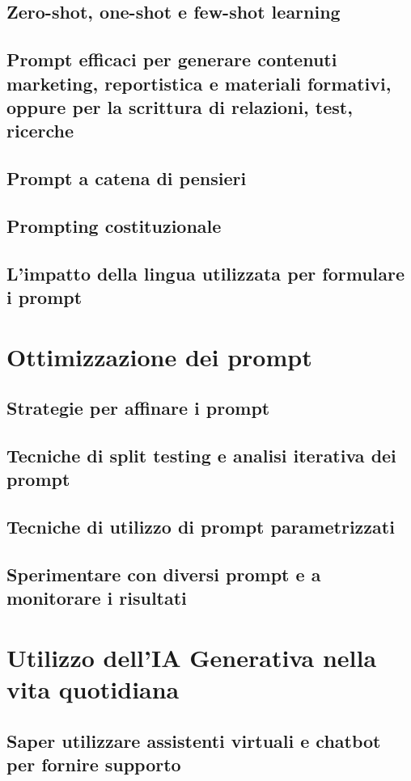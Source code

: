     \subsection{Zero-shot, one-shot e few-shot learning}
    \subsection{Prompt efficaci per generare contenuti marketing, reportistica e materiali formativi, oppure per la scrittura di relazioni, test, ricerche}
    \subsection{Prompt a catena di pensieri}
    \subsection{Prompting costituzionale}
    \subsection{L'impatto della lingua utilizzata per formulare i prompt }

\section{Ottimizzazione dei prompt}
    \subsection{Strategie per affinare i prompt}
    \subsection{Tecniche di split testing e analisi iterativa dei prompt}
    \subsection{Tecniche di utilizzo di prompt parametrizzati}
    \subsection{Sperimentare con diversi prompt e a monitorare i risultati}

\section{Utilizzo dell'IA Generativa nella vita quotidiana}
    \subsection{Saper utilizzare assistenti virtuali e chatbot per fornire supporto}
